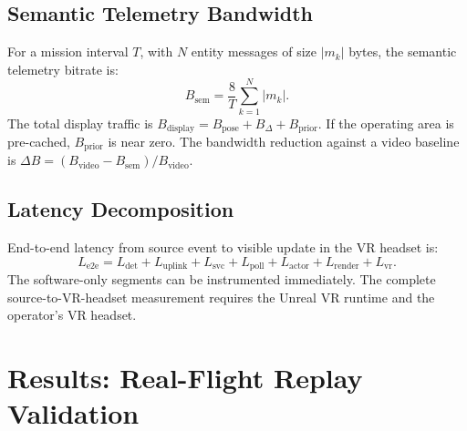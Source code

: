 \documentclass[fleqn]{VRIH2025}
\begin{document}
\subsection{Semantic Telemetry Bandwidth}
For a mission interval \(T\), with \(N\) entity messages of size \(|m_k|\) bytes, the semantic telemetry bitrate is:
\begin{equation}
B_{\mathrm{sem}} = \frac{8}{T}\sum_{k=1}^{N} |m_k|.
\end{equation}
The total display traffic is \(B_{\mathrm{display}} = B_{\mathrm{pose}} + B_{\Delta} + B_{\mathrm{prior}}\). If the operating area is pre-cached, \(B_{\mathrm{prior}}\) is near zero. The bandwidth reduction against a video baseline is \(\Delta B = (B_{\mathrm{video}} - B_{\mathrm{sem}}) / B_{\mathrm{video}}\).

\subsection{Latency Decomposition}
End-to-end latency from source event to visible update in the VR headset is:
\begin{equation}
L_{\mathrm{e2e}} = L_{\mathrm{det}} + L_{\mathrm{uplink}} + L_{\mathrm{svc}} + L_{\mathrm{poll}} + L_{\mathrm{actor}} + L_{\mathrm{render}} + L_{\mathrm{vr}}.
\end{equation}
The software-only segments can be instrumented immediately. The complete source-to-VR-headset measurement requires the Unreal VR runtime and the operator's VR headset.

\section{Results: Real-Flight Replay Validation}
\label{sec:results}
\end{document}
